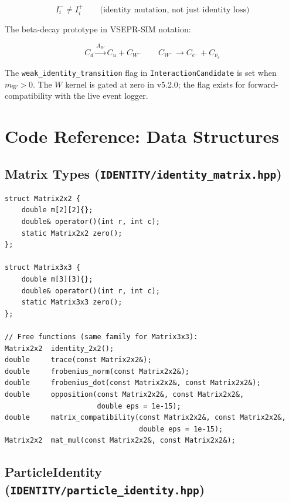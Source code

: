 \documentclass[11pt,a4paper]{article}
\theoremstyle{defbox}
\begin{document}
\begin{equation}
  I_i^- \neq I_i^+
  \qquad \text{(identity mutation, not just identity loss)}
\end{equation}

The beta-decay prototype in VSEPR-SIM notation:

\begin{equation}
  C_d \xrightarrow{A_W} C_u + C_{W^-}
  \qquad
  C_{W^-} \rightarrow C_{e^-} + C_{\bar\nu_e}
\end{equation}

The \texttt{weak\_identity\_transition} flag in \texttt{InteractionCandidate}
is set when $m_W > 0$.  The $W$ kernel is gated at zero in v5.2.0; the flag
exists for forward-compatibility with the live event logger.

\section{Code Reference: Data Structures}
\label{sec:code}

\subsection{Matrix Types (\texttt{IDENTITY/identity\_matrix.hpp})}

\begin{lstlisting}[caption={Matrix2x2 and Matrix3x3 plain aggregates.}]
struct Matrix2x2 {
	double m[2][2]{};
	double& operator()(int r, int c);
	static Matrix2x2 zero();
};

struct Matrix3x3 {
	double m[3][3]{};
	double& operator()(int r, int c);
	static Matrix3x3 zero();
};

// Free functions (same family for Matrix3x3):
Matrix2x2  identity_2x2();
double     trace(const Matrix2x2&);
double     frobenius_norm(const Matrix2x2&);
double     frobenius_dot(const Matrix2x2&, const Matrix2x2&);
double     opposition(const Matrix2x2&, const Matrix2x2&,
					  double eps = 1e-15);
double     matrix_compatibility(const Matrix2x2&, const Matrix2x2&,
								double eps = 1e-15);
Matrix2x2  mat_mul(const Matrix2x2&, const Matrix2x2&);
\end{lstlisting}

\subsection{ParticleIdentity (\texttt{IDENTITY/particle\_identity.hpp})}
\end{document}
